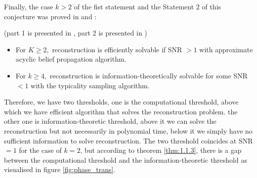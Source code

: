 Finally, the case $k>2$ of the fist statement and the Statement 2 of this conjecture was proved in \cite{As16b} and \cite{as16a}:
\begin{theorem}\label{thm:1.1.3}
(part 1 is presented in \cite{As16b}, part 2 is presented in \cite{as16a})
\begin{itemize}
    \item For $K\geq2,$ reconstruction is efficiently solvable if SNR $>1$ with approximate acyclic belief propagation algorithm.
    \item For $k\geq4,$ reconstruction is information-theoretically solvable for some SNR $<1$ with the typicality sampling algorithm.
\end{itemize}
\end{theorem}
\begin{remark}
    Therefore, we have two thresholds, one is the computational threshold, above which we have efficient algorithm that solves the reconstruction problem. the other one is information-theoretic threshold, above it we can solve the reconstruction but not necessarily in polynomial time, below it we simply have no sufficient information to solve reconstruction. The two threshold coincides at SNR $=1$ for the case of $k=2$, but according to theorem \ref{thm:1.1.3}, there is a gap between the computational threshold and the information-theoretic threshold as visualised in figure \ref{fig:phase_trans}.
\end{remark}
\clearpage
